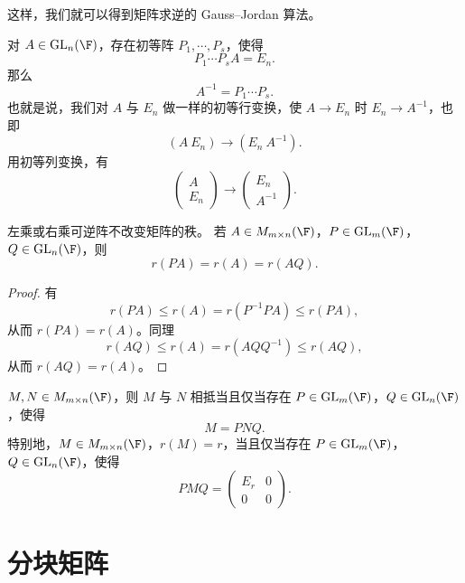 这样，我们就可以得到矩阵求逆的 Gauss--Jordan 算法。

\begin{algo}
	对 $A\in\operatorname{GL}_n(\F)$，存在初等阵 $P_1,\cdots,P_s$，使得
	\[
	P_1\cdots P_sA=E_n.
	\]
	那么
	\[
	A^{-1}=P_1\cdots P_s.
	\]
	也就是说，我们对 $A$ 与 $E_n$ 做一样的初等行变换，使 $A\to E_n$ 时 $E_n\to A^{-1}$，也即
	\[
	(A\ E_n)\longrightarrow (E_n\ A^{-1}).
	\]
	用初等列变换，有
	\[
	\left(\begin{array}{c}
		A\\ 
		E_n
	\end{array}\right)
	\longrightarrow
	\left(\begin{array}{c}
		E_n\\ 
		A^{-1}
	\end{array}\right).
	\]
\end{algo}


\begin{corollary}\label{3.4.12}
	左乘或右乘可逆阵不改变矩阵的秩。
	若 $A\in M_{m\times n}(\F)$，$P\in\operatorname{GL}_m(\F)$，$Q\in\operatorname{GL}_n(\F)$，则
	\[
	r(PA)=r(A)=r(AQ).
	\]
\end{corollary}

\begin{proof}
	有
	\[
	r(PA)\leq r(A)=r(P^{-1}PA)\leq r(PA),
	\]
	从而 $r(PA)=r(A)$。同理
	\[
	r(AQ)\leq r(A)=r(AQQ^{-1})\leq r(AQ),
	\]
	从而 $r(AQ)=r(A)$。
\end{proof}

\begin{corollary}\label{3.4.13}
	$M,N\in M_{m\times n}(\F)$，则 $M$ 与 $N$ 相抵当且仅当存在
	$P\in\operatorname{GL}_m(\F)$，$Q\in\operatorname{GL}_n(\F)$，使得
	\[
	M=PNQ.
	\]
	特别地，$M\in M_{m\times n}(\F)$，$r(M)=r$，当且仅当存在
	$P\in\operatorname{GL}_m(\F)$，$Q\in\operatorname{GL}_n(\F)$，使得
	\[
	PMQ=\begin{pmatrix}
		E_r&0\\
		0&0
	\end{pmatrix}.
	\]
\end{corollary}



\section{分块矩阵}

